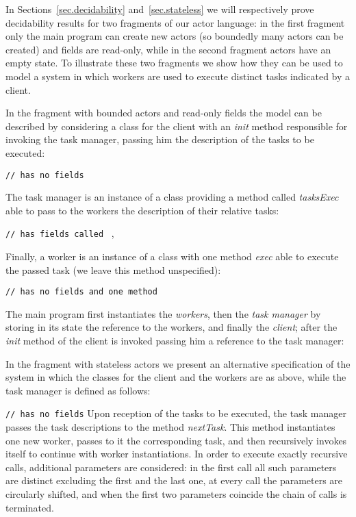 \documentclass{LMCS}
\theoremstyle{plain}\newtheorem{proposition}[thm]{Proposition}
\theoremstyle{plain}\newtheorem{lemma}[thm]{Lemma}
\theoremstyle{plain}\newtheorem{theorem}[thm]{Theorem}
\theoremstyle{plain}\newtheorem{corollary}[thm]{Corollary}
\begin{document}
\begin{exa}\label{ex:taskManager}
In Sections~\ref{sec.decidability} and~\ref{sec.stateless}
we will respectively prove decidability results for two fragments of our actor language:
in the first fragment only the main program can create new actors (so 
boundedly many actors can be created) and fields are read-only, while in the
second fragment actors have an empty state.
To illustrate these two fragments we show how they can be used to model
a system in which
 workers are used to execute  distinct tasks indicated by a client.

In the fragment with bounded actors and read-only fields the model can be described 
by considering a class  for the client with an {\it init}
method responsible for invoking the task manager, passing him the description
of the  tasks to be executed:

\; {\tt //  has no fields} 


The task manager is an instance of a class providing a method called
{\it tasksExec} able to pass to the workers the description of their 
relative tasks:

\; {\tt //  has  fields called} \ ,


Finally, a worker is an instance of a class  with one method
{\it exec} able to execute the passed task (we leave this method
unspecified):

\; {\tt //  has no fields and one method } 

The main program first instantiates the {\it workers},
then the {\it task manager} by storing in its state the reference
to the workers, and finally the {\it client}; after the {\it init}
method of the client is invoked passing him a reference to the
task manager:


In the fragment with stateless actors we present an alternative specification
of the system in which the classes for the client and the workers are
as above, while the task manager is defined as follows:

\; {\tt //  has no fields} 
Upon reception of the  tasks to be executed, the 
task manager passes the task descriptions to the method
{\it nextTask}. This method instantiates one new
worker, passes to it the corresponding task, and then
recursively invokes itself to continue with
worker instantiations. In order to execute exactly  recursive calls,
 additional parameters are considered: in the first
call all such parameters are distinct excluding the first
and the last one, at every call the parameters are
circularly shifted, and when the first two parameters coincide
the chain of calls is terminated.
\end{exa}
\end{document}
